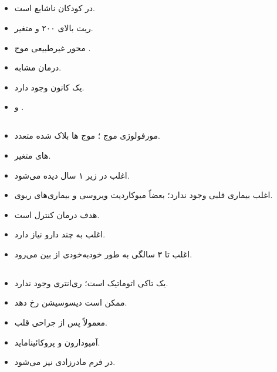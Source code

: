 \documentclass[12pt,a4paper]{article}
\begin{document}
\subsection*{}
\begin{itemize}
\item در کودکان ناشایع است.
\item ریت بالای ۲۰۰ و متغیر.
\item محور غیرطبیعی موج .
\item درمان مشابه.
\item یک کانون وجود دارد.
\item {} و .
\end{itemize}

\subsection*{}
\begin{itemize}
\item {} مورفولوژی موج ؛ موج ها بلاک شده متعدد.
\item {}های متغیر.
\item اغلب در زیر ۱ سال دیده می‌شود.
\item اغلب بیماری قلبی وجود ندارد؛ بعضاً میوکاردیت ویروسی و بیماری‌های ریوی.
\item هدف درمان کنترل  است.
\item اغلب به چند دارو نیاز دارد.
\item اغلب تا ۳ سالگی به طور خودبه‌خودی از بین می‌رود.
\end{itemize}
\subsection*{}
\begin{itemize}
\item یک تاکی اتوماتیک است؛ ری‌انتری وجود ندارد.
\item ممکن است  دیسوسیشن رخ دهد.
\item معمولاً پس از جراحی قلب.
\item آمیودارون و پروکائیناماید.
\item در فرم مادرزادی نیز  می‌شود.
\end{itemize}
\end{document}
